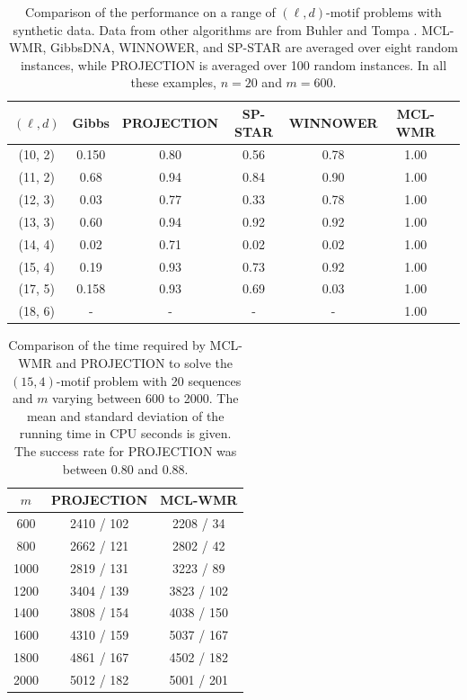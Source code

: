\begin{table}[h]
\begin{center}
\begin{tabular}{|c|c|c|c|c|c|c|}
\hline
$(\ell, d)$ & Gibbs & PROJECTION & SP-STAR & WINNOWER & MCL-WMR  \\
\hline 
(10, 2) & 0.150 & 0.80 & 0.56 & 0.78 & 1.00\\
(11, 2) & 0.68 & 0.94 & 0.84 & 0.90 & 1.00 \\
(12, 3) & 0.03 & 0.77 & 0.33 & 0.78 & 1.00 \\
(13, 3) & 0.60 & 0.94 & 0.92 & 0.92 & 1.00 \\
(14, 4) & 0.02 & 0.71 & 0.02 & 0.02 & 1.00  \\
(15, 4) & 0.19 & 0.93 & 0.73 & 0.92 & 1.00  \\
(17, 5) & 0.158 & 0.93 & 0.69 & 0.03 & 1.00 \\
(18, 6) & - & - & - & - &  1.00  \\
\hline
\end{tabular} 
\end{center}
\caption[Comparison of accuracy of MCL-WMR to other well-known motif-recognition programs on several challenge problems.]{Comparison of the performance on a range of $(\ell,d)$-motif problems with synthetic data.  Data from other algorithms are from Buhler and Tompa \cite{BT02}.  MCL-WMR, GibbsDNA, WINNOWER, and SP-STAR are averaged over eight random instances, while PROJECTION is averaged over 100 random instances.  In all these examples, $n = 20$ and $m = 600$.  }
\label{performance1}
\end{table} 


\begin{table}[h!]{
\begin{center}
\begin{tabular}{|c|c|c|}
\hline
$m$ & PROJECTION &  MCL-WMR\\
\hline 
600 & 2410 / 102  			& 2208 / 34 \\
800 & 2662 / 121			& 2802 / 42 \\
1000 & 2819 / 131			& 3223 / 89 \\
1200 & 3404 / 139 			& 3823 / 102\\
1400 & 3808 / 154 			& 4038 / 150 \\
1600 & 4310 / 159 			& 5037 / 167 \\
1800 & 4861 /  167 		& 4502 / 182 \\
2000 & 5012 / 182 			& 5001 / 201 \\
\hline
\end{tabular} 
\end{center}}
\caption[Comparison of the time required by MCL-WMR and PROJECTION to solve the $(15, 4)$-motif problem with 20 sequences of varying length.]{Comparison of the time required by MCL-WMR and PROJECTION to solve the $(15,4)$-motif problem with 20 sequences and $m$ varying between 600 to 2000.  The mean and standard deviation of the running time in CPU seconds is given. The success rate for PROJECTION was between 0.80 and 0.88.}
\label{n_table}
\end{table} 

